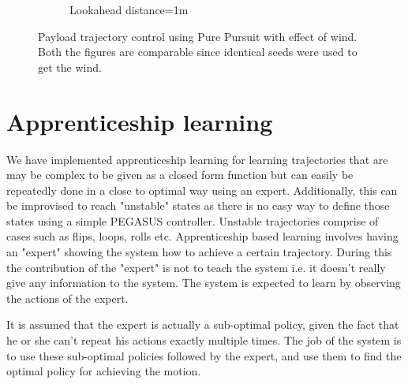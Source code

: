 \documentclass[hidelinks,BTech]{iitmdiss}
\begin{document}
\begin{figure}[H]
\begin{subfigure}[t]{0.48\textwidth}
      \caption{Lookahead distance=1m}
  \end{subfigure}
  \caption{Payload trajectory control using Pure Pursuit with effect of wind. Both the figures are comparable since identical seeds were used to get the wind.}
\end{figure}	


\chapter{Apprenticeship learning}
We have implemented apprenticeship learning for learning trajectories that are may be complex to be given as a closed form function but can easily be repeatedly done in a close to optimal way using an expert. Additionally, this can be improvised to reach "unstable" states as there is no easy way to define those states using a simple PEGASUS controller. Unstable trajectories comprise of cases such as flips, loops, rolls etc. Apprenticeship based learning involves having an "expert" showing the system how to achieve a certain trajectory. During this the contribution of the "expert" is not to teach the system i.e. it doesn't really give any information to the system. The system is expected to learn by observing the actions of the expert. 
 
 It is assumed that the expert is actually a sub-optimal policy, given the fact that he or she can't repeat his actions exactly multiple times. The job of the system is to use these sub-optimal policies followed by the expert, and use them to find the optimal policy for achieving the motion.
\end{document}
